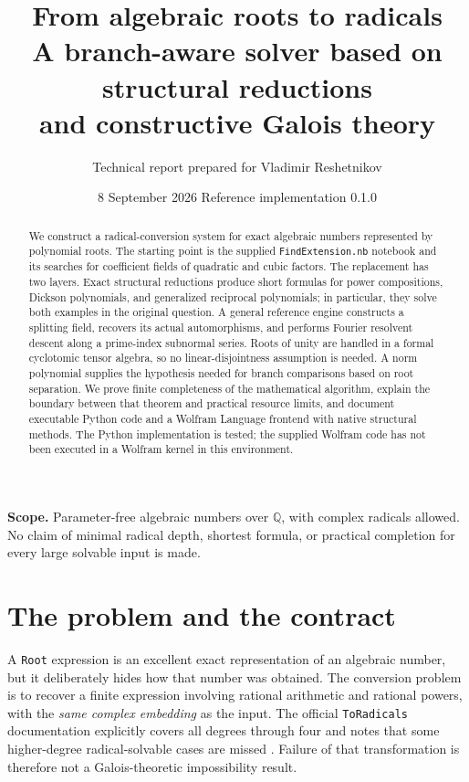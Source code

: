 \documentclass[11pt]{article}
\title{\vspace{-1cm}\textbf{From algebraic roots to radicals}\\[8pt]
\large A branch-aware solver based on structural reductions\\
and constructive Galois theory}
\author{Technical report prepared for Vladimir Reshetnikov}
\date{8 September 2026 \quad\textbullet\quad Reference implementation 0.1.0}
\theoremstyle{definition}\newtheorem{definition}[theorem]{Definition}
\theoremstyle{remark}\newtheorem{remark}[theorem]{Remark}
\newcommand{\Q}{\mathbb Q}\newcommand{\C}{\mathbb C}\newcommand{\Z}{\mathbb Z}
\newcommand{\code}[1]{\texttt{#1}}
\begin{document}
\maketitle
\begin{abstract}
We construct a radical-conversion system for exact algebraic numbers represented
by polynomial roots. The starting point is the supplied \code{FindExtension.nb}
notebook and its searches for coefficient fields of quadratic and cubic factors.
The replacement has two layers. Exact structural reductions produce short formulas
for power compositions, Dickson polynomials, and generalized reciprocal
polynomials; in particular, they solve both examples in the original question.
A general reference engine constructs a splitting field, recovers its actual
automorphisms, and performs Fourier resolvent descent along a prime-index
subnormal series. Roots of unity are handled in a formal cyclotomic tensor
algebra, so no linear-disjointness assumption is needed. A norm polynomial
supplies the hypothesis needed for branch comparisons based on root separation.
We prove finite completeness of the mathematical algorithm, explain the boundary
between that theorem and practical resource limits, and document executable
Python code and a Wolfram Language frontend with native structural methods.
The Python implementation is tested; the supplied Wolfram code has not been
executed in a Wolfram kernel in this environment.
\end{abstract}
\vspace{4pt}
\noindent\textbf{Scope.} Parameter-free algebraic numbers over $\Q$, with complex
radicals allowed. No claim of minimal radical depth, shortest formula, or
practical completion for every large solvable input is made.
\newpage
\tableofcontents
\newpage

\section{The problem and the contract}

A \code{Root} expression is an excellent exact representation of an algebraic
number, but it deliberately hides how that number was obtained. The conversion
problem is to recover a finite expression involving rational arithmetic and
rational powers, with the \emph{same complex embedding} as the input. The official
\code{ToRadicals} documentation explicitly covers all degrees through four and
notes that some higher-degree radical-solvable cases are missed
\cite{wolfram-toradicals}. Failure of that transformation is therefore not a
Galois-theoretic impossibility result.
\end{document}
